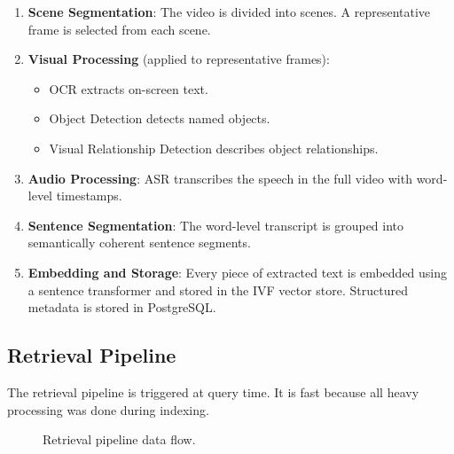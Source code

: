 \documentclass[12pt, a4paper]{report}
\begin{document}
\begin{enumerate}
  \item \textbf{Scene Segmentation}: The video is divided into scenes.
    A representative frame is selected from each scene.
  \item \textbf{Visual Processing} (applied to representative frames):
    \begin{itemize}
      \item OCR extracts on-screen text.
      \item Object Detection detects named objects.
      \item Visual Relationship Detection describes object relationships.
    \end{itemize}
  \item \textbf{Audio Processing}: ASR transcribes the speech in the full
    video with word-level timestamps.
  \item \textbf{Sentence Segmentation}: The word-level transcript is grouped
    into semantically coherent sentence segments.
  \item \textbf{Embedding and Storage}: Every piece of extracted text is
    embedded using a sentence transformer and stored in the IVF vector store.
    Structured metadata is stored in PostgreSQL.
\end{enumerate}

\subsection{Retrieval Pipeline}

The retrieval pipeline is triggered at query time. It is fast because
all heavy processing was done during indexing.

\begin{figure}[H]
  \centering
  \caption{Retrieval pipeline data flow.}
  \label{fig:retrieval_pipeline}
\end{figure}
\end{document}
